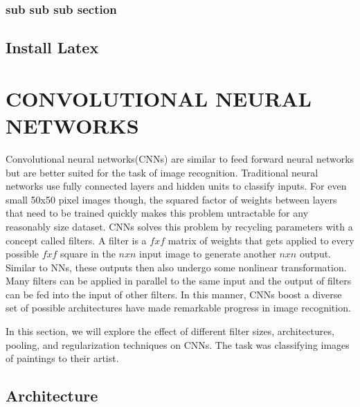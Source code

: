 \documentclass[10pt,twoside]{article}
\begin{document}
\subsubsection{sub sub sub section}


\subsection{Install Latex}


\section{\uppercase{Convolutional Neural Networks}}

\noindent Convolutional neural networks(CNNs) are similar to feed forward neural networks but are better suited for the task of image recognition. Traditional neural networks use fully connected layers and hidden units to classify inputs. For even small 50x50 pixel images though, the squared factor of weights between layers that need to be trained quickly makes this problem untractable for any reasonably size dataset.  CNNs solves this problem by recycling parameters with a concept called filters. A filter is a $fxf$ matrix of weights that gets applied to every possible $fxf$ square in the $nxn$ input image to generate another $nxn$ output. Similar to NNs, these outputs then also undergo some nonlinear transformation. Many filters can be applied in parallel to the same input and the output of filters can be fed into the input of other filters. In this manner, CNNs boost a diverse set of possible architectures have made remarkable progress in image recognition.

In this section, we will explore the effect of different filter sizes, architectures, pooling, and regularization techniques on CNNs. The task was classifying images of paintings to their artist.

\subsection{Architecture}
\end{document}

